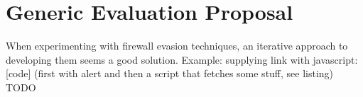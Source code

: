 \section{Generic Evaluation Proposal}
When experimenting with firewall evasion techniques, an iterative approach to developing them seems a good solution. Example: supplying link with javascript:[code] (first with alert and then a script that fetches some stuff, see listing)
{\color{red}TODO}
